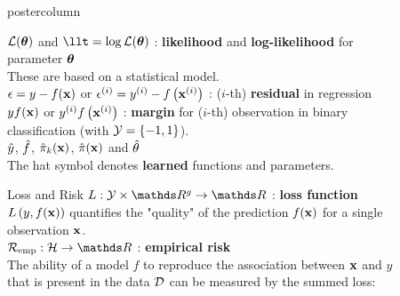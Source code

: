 \documentclass{beamer}
\begin{document}
\begin{frame}[fragile]{}
\begin{columns}
\begin{column}{.31\textwidth}
\begin{beamercolorbox}[center]{postercolumn}
\begin{minipage}{.98\textwidth}
{\begin{myblock}{}
$\mathcal{L}(\bm{\theta})$ and $\llt = \log\LLt$ : \textbf{likelihood} and \textbf{log-likelihood} for \\ parameter $\bm{\theta}$ \\
  \hspace*{1ex}These are based on a statistical model.\\
 
$\epsilon = y - f(\mathbf{x})$ or $\epsilon^{(i)} = y^{(i)} - f\left(\mathbf{x}^{(i)}\right)$ : ($i$-th) \textbf{residual} in regression\\

$y f(\mathbf{x})$ or $y^{(i)} f\left(\mathbf{x}^{(i)}\right)$ : \textbf{margin} for ($i$-th) observation in binary \\ classification (with $\mathcal{Y} = \{-1, 1\}$). \\

$\hat{y}$, $\hat{f}$, $\hat \pi_{k}(\mathbf{x})$, $\hat \pi(\mathbf{x})$ and $\hat{\theta}$ \\
  \hspace*{1ex}The hat symbol denotes \textbf{learned} functions and parameters.
\end{myblock}
\begin{myblock}{Loss and Risk}
  $L: \Yspace \times \R^g \to \R$ : \textbf{loss function} \\
  \hspace*{1ex} $L\left(y, f(\mathbf{x})\right)$ quantifies the "quality" of the prediction $f(\mathbf{x})$ for a single \\
  \hspace*{1ex} observation $\mathbf{x}$.  \\
  
  $\riske:  \Hspace \to \R $ : \textbf{empirical risk } \\
  \hspace*{1ex} The ability of a model $f$ to reproduce the association between $\mathbf{x}$ and $y$ \\
  \hspace*{1ex} that is present in the data $\mathcal{D}$ can be measured by the summed loss:
  

\end{myblock}}
\end{minipage}
\end{beamercolorbox}
\end{column}
\end{columns}
\end{frame}
\end{document}
